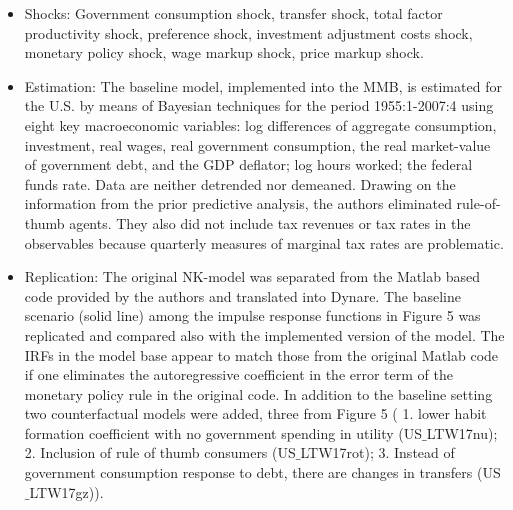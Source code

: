 \documentclass[11pt,a4paper]{article}
\begin{document}
\begin{itemize}
		\item Shocks: Government consumption shock, transfer shock, total factor productivity shock, preference shock, investment adjustment costs shock, monetary policy shock, wage markup shock, price markup shock.
		
		\item Estimation: The baseline model, implemented into the MMB, is estimated for the U.S. by means of Bayesian techniques for the period 1955:1-2007:4 using eight key macroeconomic variables: log differences of aggregate consumption, investment, real wages, real government consumption, the real market-value of government debt, and the GDP deflator; log hours worked; the federal funds rate. Data are neither detrended nor demeaned. Drawing on the information from the prior predictive analysis, the authors eliminated rule-of-thumb agents. They also did not include tax revenues or tax rates in the observables because quarterly measures of marginal tax rates are problematic.
		
		\item Replication: The original NK-model was separated from the Matlab based code provided by the authors and translated into Dynare. The baseline scenario (solid line) among the impulse response functions in Figure 5 was replicated and compared also with the implemented version of the model. The IRFs in the model base appear to match those from the original Matlab code if one eliminates the autoregressive coefficient in the error term of the monetary policy rule in the original code. In addition to the baseline setting two counterfactual models were added, three from Figure 5 ( 1. lower habit formation coefficient with no government spending in utility (US$\_$LTW17nu); 2. Inclusion of rule of thumb consumers (US$\_$LTW17rot); 3. Instead of government consumption response to debt, there are changes in transfers (US$\_$LTW17gz)).
		
	\end{itemize}
	
	
	
\end{document}
